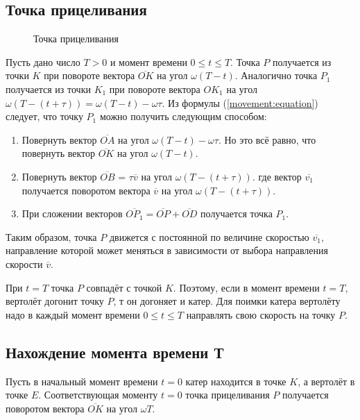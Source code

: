\documentclass[12pt,a4paper,titlepage]{article}
\begin{document}
  \subsection{Точка прицеливания}
    \begin{figure}
      \centering
      \def\svgwidth{\columnwidth}
      
      \caption{Точка прицеливания}
    \end{figure}
    Пусть дано число $T > 0$ и момент времени $0 \leq t \leq T$.
    Точка $P$ получается из точки $K$ при повороте вектора $\overline{OK}$ на угол $\omega(T - t)$.
    Аналогично точка $P_1$ получается из точки $K_1$ при повороте вектора $OK_1$ на угол
    $\omega(T-(t + \tau)) = \omega(T - t) - \omega\tau$.
    Из формулы (\ref{movement:equation}) следует, что точку $P_1$ можно получить следующим способом:
    \begin{enumerate}
      \item
	Повернуть вектор $\overline{OA}$ на угол $\omega(T-t) - \omega\tau$.
	Но это всё равно, что повернуть вектор $\overline{OK}$ на угол $\omega(T - t)$.
      \item
	Повернуть вектор $\overline{OB}$ = $\tau \overline{v}$ на угол
	$\omega(T - (t + \tau))$.
	где вектор $\overline{v_1}$ получается поворотом вектора $\overline{v}$ на угол $\omega(T - (t + \tau))$.
      \item
	При сложении векторов $\overline{OP_1} = \overline{OP} + \overline{OD}$ получается точка $P_1$.
    \end{enumerate}
    
    Таким образом, точка $P$ движется с постоянной по величине скоростью $\overline{v_1}$,
    направление которой может меняться в зависимости от выбора направления скорости $\overline{v}$.
    
    При $t = T$ точка $P$ совпадёт с точкой $K$.
    Поэтому, если в момент времени $t = T$, вертолёт догонит точку $P$, т он догоняет и катер.
    Для поимки катера вертолёту надо в каждый момент времени $0 \leq t \leq T$ направлять свою скорость на точку $P$. 
  \subsection{Нахождение момента времени Т}
  \par
    Пусть в начальный момент времени $t = 0$ катер находится в точке $K$, а вертолёт в точке $E$.
    Соответствующая моменту $t = 0$ точка прицеливания $P$ получается поворотом вектора $\overline{OK}$ на угол $\omega T$.
    
\end{document}

